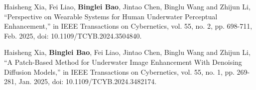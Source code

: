 
\begin{achievements}

\begin{theachievements}[已发表论文]
  \item Haisheng Xia, Fei Liao, \textbf{Binglei Bao}, Jintao Chen, Binglu Wang and Zhijun Li, “Perspective on Wearable Systems for Human Underwater Perceptual Enhancement,” in IEEE Transactions on Cybernetics, vol. 55, no. 2, pp. 698-711, Feb. 2025, doi: 10.1109/TCYB.2024.3504840.
  \item Haisheng Xia, \textbf{Binglei Bao}, Fei Liao, Jintao Chen, Binglu Wang and Zhijun Li, “A Patch-Based Method for Underwater Image Enhancement With Denoising Diffusion Models,” in IEEE Transactions on Cybernetics, vol. 55, no. 1, pp. 269-281, Jan. 2025, doi: 10.1109/TCYB.2024.3482174.
\end{theachievements}




\end{achievements}
